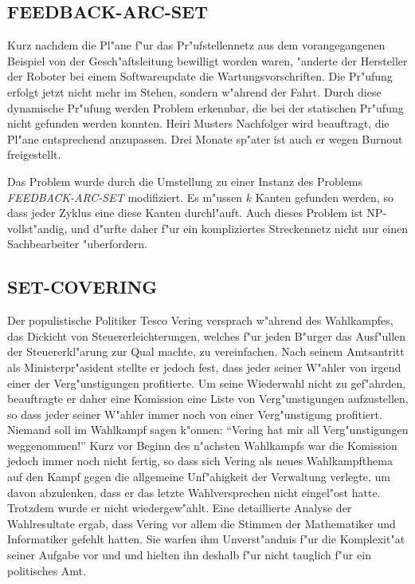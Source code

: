 \subsection{FEEDBACK-ARC-SET}
Kurz nachdem die Pl"ane f"ur das Pr"ufstellennetz aus dem vorangegangenen
Beispiel von der Gesch"aftsleitung bewilligt worden waren, "anderte
der Hersteller der Roboter bei einem Softwareupdate die Wartungsvorschriften.
Die Pr"ufung erfolgt jetzt nicht mehr im Stehen, sondern w"ahrend der
Fahrt.
Durch diese dynamische Pr"ufung werden Problem erkennbar, die bei der
statischen Pr"ufung nicht gefunden werden konnten. Heiri Musters
Nachfolger wird beauftragt, die Pl"ane entsprechend anzupassen.
Drei Monate sp"ater ist auch er wegen Burnout freigestellt.

\medskip

Das Problem wurde durch die Umstellung zu einer Instanz des
Problems {\it FEEDBACK-ARC-SET} modifiziert.
Es m"ussen $k$ Kanten gefunden werden, so dass jeder Zyklus eine
diese Kanten durchl"auft. Auch dieses Problem ist NP-vollst"andig,
und d"urfte daher f"ur ein kompliziertes Streckennetz
nicht nur einen Sachbearbeiter "uberfordern.

\subsection{SET-COVERING}
Der populistische Politiker Tesco Vering versprach w"ahrend des
Wahlkampfes, das Dickicht von Steuererleichterungen, welches
f"ur jeden B"urger das Ausf"ullen der Steuererkl"arung zur Qual
machte, zu vereinfachen.
Nach seinem Amtsantritt als Ministerpr"asident 
stellte er jedoch fest, dass jeder seiner W"ahler von irgend einer
der Verg"unstigungen profitierte. Um seine Wiederwahl nicht
zu gef"ahrden, beauftragte er daher eine Komission eine Liste
von Verg"unstigungen aufzustellen, so dass jeder seiner W"ahler
immer noch von einer Verg"unstigung profitiert. Niemand soll im
Wahlkampf sagen k"onnen: ``Vering hat mir all Verg"unstigungen weggenommen!''
Kurz vor Beginn des n"achsten Wahlkampfs war die Komission jedoch
immer noch nicht fertig, so dass sich Vering als neues Wahlkampfthema
auf den Kampf gegen die allgemeine Unf"ahigkeit der Verwaltung verlegte,
um davon
abzulenken, dass er das letzte Wahlversprechen nicht eingel"ost hatte.
Trotzdem wurde er nicht wiedergew"ahlt. Eine detaillierte Analyse der
Wahlresultate ergab, dass Vering vor allem die Stimmen der Mathematiker und
Informatiker gefehlt hatten.
Sie warfen ihm Unverst"andnis f"ur die Komplexit"at seiner Aufgabe vor und 
und hielten ihn deshalb f"ur nicht tauglich f"ur ein politisches Amt.

